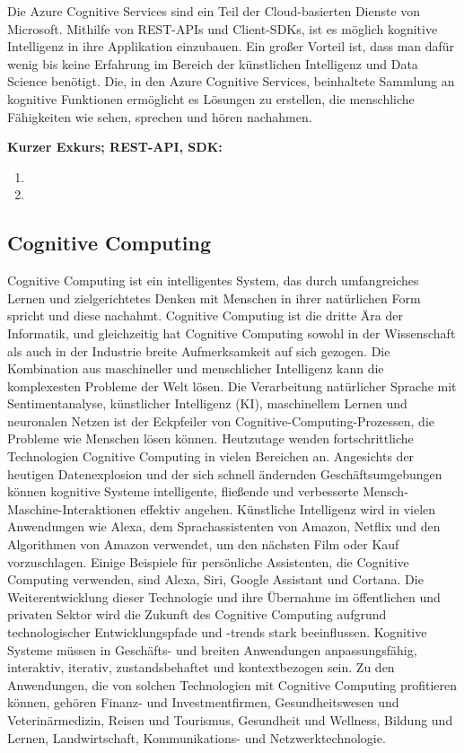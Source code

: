 Die Azure Cognitive Services sind ein Teil der Cloud-basierten Dienste von Microsoft. Mithilfe von REST-APIs und Client-SDKs, ist es möglich kognitive Intelligenz in ihre Applikation einzubauen. Ein großer Vorteil ist, dass man dafür wenig bis keine Erfahrung im Bereich der künstlichen Intelligenz und Data Science benötigt. Die, in den Azure Cognitive Services, beinhaltete Sammlung an kognitive Funktionen ermöglicht es Lösungen zu erstellen, die menschliche Fähigkeiten wie sehen, sprechen und hören nachahmen.

\textbf{Kurzer Exkurs; REST-API, SDK:}

\begin{enumerate}
    \item 
    \item 
\end{enumerate}

\subsection{Cognitive Computing}

Cognitive Computing ist ein intelligentes System, das durch umfangreiches Lernen und zielgerichtetes Denken mit Menschen in ihrer natürlichen Form spricht und diese nachahmt. Cognitive Computing ist die dritte Ära der Informatik, und gleichzeitig hat Cognitive Computing sowohl in der Wissenschaft als auch in der Industrie breite Aufmerksamkeit auf sich gezogen. Die Kombination aus maschineller und menschlicher Intelligenz kann die komplexesten Probleme der Welt lösen. Die Verarbeitung natürlicher Sprache mit Sentimentanalyse, künstlicher Intelligenz (KI), maschinellem Lernen und neuronalen Netzen ist der Eckpfeiler von Cognitive-Computing-Prozessen, die Probleme wie Menschen lösen können. Heutzutage wenden fortschrittliche Technologien Cognitive Computing in vielen Bereichen an. Angesichts der heutigen Datenexplosion und der sich schnell ändernden Geschäftsumgebungen können kognitive Systeme intelligente, fließende und verbesserte Mensch-Maschine-Interaktionen effektiv angehen. Künstliche Intelligenz wird in vielen Anwendungen wie Alexa, dem Sprachassistenten von Amazon, Netflix und den Algorithmen von Amazon verwendet, um den nächsten Film oder Kauf vorzuschlagen. Einige Beispiele für persönliche Assistenten, die Cognitive Computing verwenden, sind Alexa, Siri, Google Assistant und Cortana. Die Weiterentwicklung dieser Technologie und ihre Übernahme im öffentlichen und privaten Sektor wird die Zukunft des Cognitive Computing aufgrund technologischer Entwicklungspfade und -trends stark beeinflussen. Kognitive Systeme müssen in Geschäfts- und breiten Anwendungen anpassungsfähig, interaktiv, iterativ, zustandsbehaftet und kontextbezogen sein. Zu den Anwendungen, die von solchen Technologien mit Cognitive Computing profitieren können, gehören Finanz- und Investmentfirmen, Gesundheitswesen und Veterinärmedizin, Reisen und Tourismus, Gesundheit und Wellness, Bildung und Lernen, Landwirtschaft, Kommunikations- und Netzwerktechnologie.

